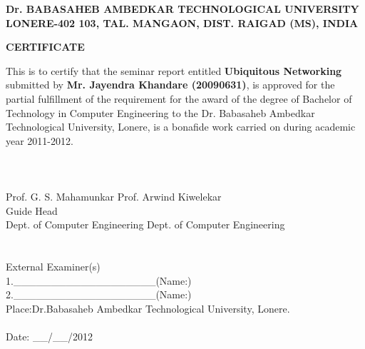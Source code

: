\documentclass[12pt]{report}
\begin{document}
\newpage
\begin{center}
{\bf Dr. BABASAHEB AMBEDKAR TECHNOLOGICAL UNIVERSITY \\ LONERE-402 103, TAL. MANGAON, DIST. RAIGAD (MS), INDIA}
\vspace{0.1in}
\begin{figure*}[h]
\centerline{}
\end{figure*}
\vspace{0.1in}
{\bf \large CERTIFICATE}
\vspace{0.1in}
\end{center}
\par
This is to certify that the seminar report entitled \textbf{Ubiquitous Networking} submitted by \textbf{Mr. Jayendra Khandare (20090631)}, is approved for the partial fulfillment of the requirement for the award of the degree of Bachelor of Technology in Computer Engineering to the Dr. Babasaheb Ambedkar Technological University, Lonere, is a bonafide work carried on during academic year 2011-2012.\\
\vspace{0.3in}
\noindent
\\
\\
\\
\hspace*{0.3in} Prof. G. S. Mahamunkar \hspace{1.3in} Prof. Arwind Kiwelekar \\
\hspace*{0.8in} Guide \hspace{2.7in} Head\\
Dept. of Computer Engineering \hspace{0.7in} Dept. of Computer Engineering\\
\\
\\
External Examiner(s)\\
\hspace*{1.5in}1.\_\_\_\_\_\_\_\_\_\_\_\_\_\_\_\_\_\_\_(Name:\hspace{2.0in})\\
\hspace*{1.5in}2.\_\_\_\_\_\_\_\_\_\_\_\_\_\_\_\_\_\_\_(Name:\hspace{2.0in})\\
Place:Dr.Babasaheb Ambedkar Technological University, Lonere.\\
\\
Date: \_\_/\_\_/2012
\thispagestyle{empty}
\end{document}
